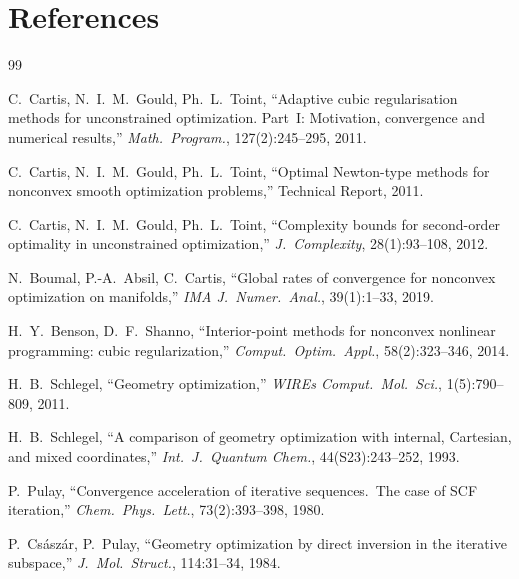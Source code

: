 \documentclass[11pt,a4paper]{article}
\theoremstyle{definition}
\begin{document}
\section*{References}

\begin{thebibliography}{99}

  C.~Cartis, N.~I.~M.~Gould, Ph.~L.~Toint,
  ``Adaptive cubic regularisation methods for unconstrained optimization.
  Part~I: Motivation, convergence and numerical results,''
  \emph{Math.\ Program.}, 127(2):245--295, 2011.

  C.~Cartis, N.~I.~M.~Gould, Ph.~L.~Toint,
  ``Optimal Newton-type methods for nonconvex smooth optimization problems,''
  Technical Report, 2011.

  C.~Cartis, N.~I.~M.~Gould, Ph.~L.~Toint,
  ``Complexity bounds for second-order optimality in unconstrained optimization,''
  \emph{J.~Complexity}, 28(1):93--108, 2012.

  N.~Boumal, P.-A.~Absil, C.~Cartis,
  ``Global rates of convergence for nonconvex optimization on manifolds,''
  \emph{IMA J.\ Numer.\ Anal.}, 39(1):1--33, 2019.

  H.~Y.~Benson, D.~F.~Shanno,
  ``Interior-point methods for nonconvex nonlinear programming:
  cubic regularization,''
  \emph{Comput.\ Optim.\ Appl.}, 58(2):323--346, 2014.

  H.~B.~Schlegel,
  ``Geometry optimization,''
  \emph{WIREs Comput.\ Mol.\ Sci.}, 1(5):790--809, 2011.

  H.~B.~Schlegel,
  ``A comparison of geometry optimization with internal, Cartesian,
  and mixed coordinates,''
  \emph{Int.\ J.\ Quantum Chem.}, 44(S23):243--252, 1993.

  P.~Pulay,
  ``Convergence acceleration of iterative sequences.\ The case of SCF iteration,''
  \emph{Chem.\ Phys.\ Lett.}, 73(2):393--398, 1980.

  P.~Cs\'asz\'ar, P.~Pulay,
  ``Geometry optimization by direct inversion in the iterative subspace,''
  \emph{J.\ Mol.\ Struct.}, 114:31--34, 1984.


\end{thebibliography}
\end{document}
